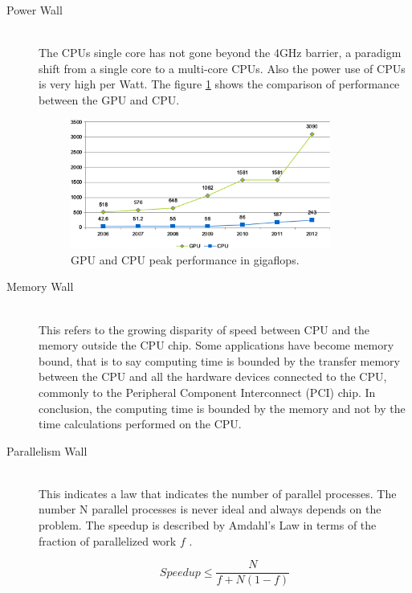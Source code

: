 \begin{description}
  \item[Power Wall] \hfill \\
  The CPUs single core has not gone beyond the 4GHz barrier, a paradigm shift from a single core to a multi-core CPUs. Also the power use of CPUs is very high per Watt. The figure \ref{fig:gpu_cpu_s} shows the comparison of performance between the GPU and CPU.

\begin{figure}[htbp]
	\centering
		\includegraphics[width=0.84\textwidth]{Figures/GPU_CPU_s.png}
		\smallskip
	\caption[GPU and CPU performance comparison]{GPU and CPU peak performance in gigaflops.}
	\label{fig:gpu_cpu_s}
\end{figure}

  \item[Memory Wall] \hfill \\
  This refers to the growing disparity of speed between CPU  and the memory outside the CPU chip. Some applications have become memory bound, that is to say computing time is bounded by the transfer memory between the CPU and all the hardware devices connected to the CPU, commonly to the Peripheral Component Interconnect (PCI) chip. In conclusion, the computing time is bounded by the memory and not by the time calculations performed on the CPU.

  \item[Parallelism Wall] \hfill \\
  This indicates a law that indicates the number of parallel processes. The number N parallel processes is never ideal and always depends on the problem.  The speedup is described by Amdahl's Law in terms of the fraction of parallelized work $f$ \cite{quantitative}.

  $$Speedup \leq \frac{N}{f + N(1-f)}$$


\end{description}


